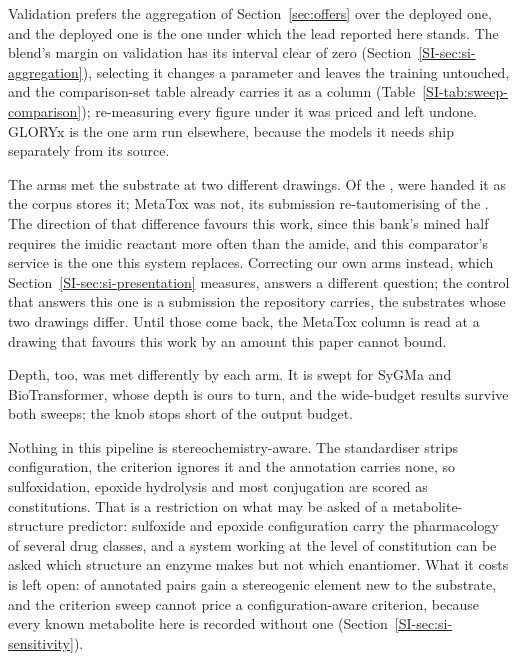 Validation prefers the aggregation of Section~\ref{sec:offers} over the deployed one, and the
deployed one is the one under which the lead reported here stands. The blend's margin on
validation has its interval clear of zero (Section~\ref{SI-sec:si-aggregation}), selecting it
changes a parameter and leaves the training untouched, and the comparison-set table already
carries it as a column (Table~\ref{SI-tab:sweep-comparison}); re-measuring every figure under it
was priced and left undone. GLORYx is the one arm run elsewhere, because the models it needs ship
separately from its source.

The arms met the substrate at two different drawings. Of the \numChemArmsWord{},
\numChemDrawnstoredWord{} were handed it as the corpus stores it; MetaTox was not, its submission
re-tautomerising \numDialectMetatoxretaut{} of the \numDialectMetatoxn{}. The direction of that difference favours this work, since this
bank's mined half requires the imidic reactant more often than the amide, and this comparator's
service is the one this system replaces. Correcting our own arms instead, which
Section~\ref{SI-sec:si-presentation} measures, answers a different question; the control that
answers this one is a submission the repository carries, the \numMtcorpusN{} substrates whose
two drawings differ. Until those come back, the MetaTox column is read at a
drawing that favours this work by an amount this paper cannot bound.

Depth, too, was met differently by each arm. It is swept for SyGMa and BioTransformer,
whose depth is ours to turn, and the wide-budget results survive both sweeps; the knob stops
short of the output budget.

Nothing in this pipeline is stereochemistry-aware. The standardiser strips configuration, the
criterion ignores it and the annotation carries none, so sulfoxidation, epoxide hydrolysis and
most conjugation are scored as constitutions. That is a restriction on what may be asked of a
metabolite-structure predictor: sulfoxide and epoxide configuration carry the pharmacology of
several drug classes, and a system working at the level of constitution can be asked which
structure an enzyme makes but not which enantiomer. What it costs is left open:
\numStereoSharePct{} of annotated pairs gain a stereogenic element new to the substrate, and the
criterion sweep cannot price a configuration-aware criterion, because every known metabolite here
is recorded without one (Section~\ref{SI-sec:si-sensitivity}).

